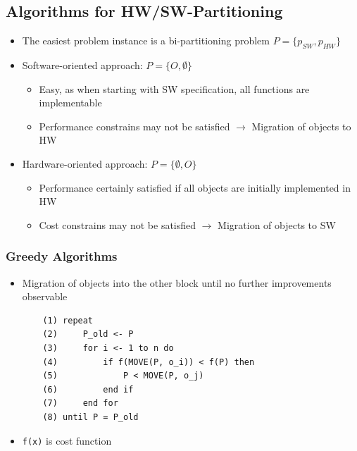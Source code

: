 \subsection{Algorithms for HW/SW-Partitioning}
\begin{itemize}
	\item The easiest problem instance is a bi-partitioning problem $P=\{p_{SW}, p_{HW}\}$
	\item Software-oriented approach: $P=\{O, \emptyset\}$
\begin{itemize}
	\item Easy, as when starting with SW specification, all functions are implementable
	\item Performance constrains may not be satisfied $\rightarrow$ Migration of objects to HW 
\end{itemize}
	\item Hardware-oriented approach: $P=\{\emptyset, O\}$
\begin{itemize}
	\item Performance certainly satisfied if all objects are initially implemented in HW
	\item Cost constrains may not be satisfied $\rightarrow$ Migration of objects to SW
\end{itemize}
\end{itemize}

\subsubsection{Greedy Algorithms}
\begin{itemize}
	\item Migration of objects into the other block until no further improvements observable
\begin{verbatim}
	(1) repeat
	(2)     P_old <- P
	(3)     for i <- 1 to n do
	(4)         if f(MOVE(P, o_i)) < f(P) then
	(5)             P < MOVE(P, o_j)
	(6)         end if
	(7)     end for
	(8) until P = P_old
\end{verbatim}
	\item \verb|f(x)| is cost function
\end{itemize}





